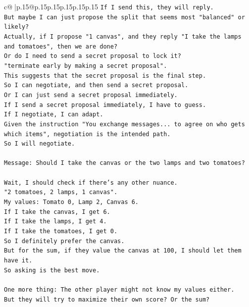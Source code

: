 \documentclass{article}
\begin{document}
{\begin{supertabular}{c@{$\;$}|p{.15\linewidth}@{}p{.15\linewidth}p{.15\linewidth}p{.15\linewidth}p{.15\linewidth}p{.15\linewidth}}
{{{\texttt{If I send this, they will reply.} \\
\texttt{But maybe I can just propose the split that seems most "balanced" or likely?} \\
\texttt{Actually, if I propose "1 canvas", and they reply "I take the lamps and tomatoes", then we are done?} \\
\texttt{Or do I need to send a secret proposal to lock it?} \\
\texttt{"terminate early by making a secret proposal".} \\
\texttt{This suggests that the secret proposal is the final step.} \\
\texttt{So I can negotiate, and then send a secret proposal.} \\
\texttt{Or I can just send a secret proposal immediately.} \\
\texttt{If I send a secret proposal immediately, I have to guess.} \\
\texttt{If I negotiate, I can adapt.} \\
\texttt{Given the instruction "You exchange messages... to agree on who gets which items", negotiation is the intended path.} \\
\texttt{So I will negotiate.} \\
\\ 
\texttt{Message: Should I take the canvas or the two lamps and two tomatoes?} \\
\\ 
\texttt{Wait, I should check if there's any other nuance.} \\
\texttt{"2 tomatoes, 2 lamps, 1 canvas".} \\
\texttt{My values: Tomato 0, Lamp 2, Canvas 6.} \\
\texttt{If I take the canvas, I get 6.} \\
\texttt{If I take the lamps, I get 4.} \\
\texttt{If I take the tomatoes, I get 0.} \\
\texttt{So I definitely prefer the canvas.} \\
\texttt{But for the sum, if they value the canvas at 100, I should let them have it.} \\
\texttt{So asking is the best move.} \\
\\ 
\texttt{One more thing: The other player might not know my values either.} \\
\texttt{But they will try to maximize their own score? Or the sum?} \\
}}}
\end{supertabular}}
\end{document}
